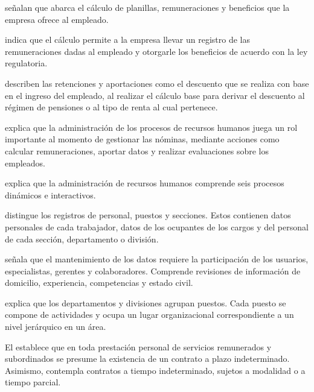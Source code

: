 \textcite[p.~26, sección~1.2]{fernandez2023implementacion} señalan que abarca el cálculo de planillas, 
remuneraciones y beneficios que la empresa ofrece al empleado.

\textcite[p.~23, sección~3.4]{lima2022implementacion} indica que el cálculo permite a la empresa llevar un registro de las remuneraciones 
dadas al empleado y otorgarle los beneficios de acuerdo con la ley regulatoria.

\textcite[p.~31, sección~1.2]{aguilar2022desarrollo} describen las retenciones y aportaciones como el descuento que se realiza con base en el ingreso del empleado, 
al realizar el cálculo base para derivar el descuento al régimen de pensiones o al tipo de renta al cual pertenece.

\textcite[p. 16]{dessler2011administracion} explica que la administración de los procesos de recursos humanos juega un rol importante al momento de gestionar las nóminas, 
mediante acciones como calcular remuneraciones, aportar datos y realizar evaluaciones sobre los empleados.

\textcite[15]{chiavenato2009talento} explica que la administración de recursos humanos comprende seis procesos dinámicos e interactivos.

 \textcite[511]{chiavenato2009talento} distingue los registros de personal, puestos y secciones. 
Estos contienen datos personales de cada trabajador, datos de los ocupantes de los cargos y del personal de cada sección, departamento o división.

 \textcite[512]{chiavenato2009talento} señala que el mantenimiento de los datos requiere la participación de los usuarios, 
especialistas, gerentes y colaboradores. Comprende revisiones de información de domicilio, experiencia, competencias y estado civil.

 \textcite[202--203]{chiavenato2009talento} explica que los departamentos y divisiones agrupan puestos. 
Cada puesto se compone de actividades y ocupa un lugar organizacional correspondiente a un nivel jerárquico en un área.

 El \textcite[art.~4]{ds0031997} establece que en toda prestación personal de servicios remunerados y subordinados 
se presume la existencia de un contrato a plazo indeterminado. Asimismo, contempla contratos a tiempo indeterminado, sujetos a modalidad o a tiempo parcial.

